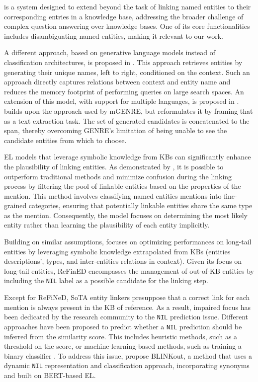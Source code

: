 \citep[CLOCQ]{Christmann2022clocq} is a system designed to extend beyond the task of linking named entities to their corresponding entries in a knowledge base, addressing the broader challenge of complex question answering over knowledge bases. One of its core functionalities includes disambiguating named entities, making it relevant to our work.

A different approach, based on generative language models instead of classification architectures, is proposed in \citep[GENRE]{decao2021autoregressive}.
This approach retrieves entities by generating their unique names, left to right, conditioned on the context.
Such an approach directly captures relations between context and entity name and reduces the memory footprint of performing queries on large search spaces.
An extension of this model, with support for multiple languages, is proposed in \citep[mGENRE]{de-cao-etal-2022-multilingual}. 
\citep[ExtEnD]{barba-etal-2022-extend} builds upon the approach used by mGENRE, but reformulates it by framing that as a text extraction task.
The set of generated candidates is concatenated to the span, thereby overcoming GENRE's limitation of being unable to see the candidate entities from which to choose.

EL models that leverage symbolic knowledge from KBs can significantly enhance the plausibility of linking entities.
As demonstrated by \citet{tedeschi-etal-2021-named-entity}, it is possible to outperform traditional methods and minimize confusion during the linking process by filtering the pool of linkable entities based on the properties of the mention.
This method involves classifying named entities mentions into fine-grained categories, ensuring that potentially linkable entities share the same type as the mention.
Consequently, the model focuses on determining the most likely entity rather than learning the plausibility of each entity implicitly.

Building on similar assumptions, \citep[ReFinED]{ayoola-etal-2022-improving} focuses on optimizing performances on long-tail entities by leveraging symbolic knowledge extrapolated from KBs (entities descriptions', types, and inter-entities relations in context). Given its focus on long-tail entities, ReFinED encompasses the management of out-of-KB entities by including the \texttt{NIL} label as a possible candidate for the linking step.

Except for ReFiNeD, SoTA entity linkers presuppose that a correct link for each mention is always present in the KB of reference.
As a result, impaired focus has been dedicated by the research community to the \texttt{NIL} prediction issue.
Different approaches have been proposed to predict whether a \texttt{NIL} prediction should be inferred from the similarity score.
This includes heuristic methods, such as a threshold on the score, or machine-learning-based methods, such as training a binary classifier \citep{sevgiliNeuralEntityLinking2022}. To address this issue, \citet{10.1145/3583780.3615036} propose BLINKout, a method that uses a dynamic \texttt{NIL} representation and classification approach, incorporating synonyms and built on BERT-based EL.
 
